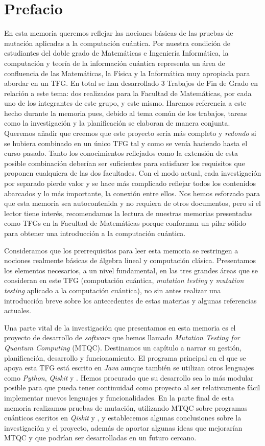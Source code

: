 
\chapter*{Prefacio}

En esta memoria queremos reflejar las nociones básicas de las pruebas de mutación aplicadas a la computación cuántica. Por nuestra condición de estudiantes del doble grado de Matemáticas e Ingeniería Informática, la computación y teoría de la información cuántica representa un área de confluencia de las Matemáticas, la Física y la Informática muy apropiada para abordar en un TFG.
%
En total se han desarrollado 3 Trabajos de Fin de Grado en relación a este tema: dos realizados para la Facultad de Matemáticas, por cada uno de los integrantes de este grupo, y este mismo. Haremos referencia a este hecho durante la memoria pues, debido al tema común de los trabajos, tareas como la investigación y la planificación se elaboran de manera conjunta.
%
Queremos añadir que creemos que este proyecto sería más completo y {\it redondo} si se hubiera combinado en un único TFG tal y como se venía haciendo hasta el curso pasado. Tanto los conocimientos reflejados como la extensión de esta posible combinación deberían ser suficientes para satisfacer los requisitos que proponen cualquiera de las dos facultades. Con el modo actual, cada investigación por separado pierde valor y se hace más complicado reflejar todos los contenidos abarcados y lo más importante, la conexión entre ellos.
%
Nos hemos esforzado para que esta memoria sea autocontenida y no requiera de otros documentos, pero si el lector tiene interés, recomendamos la lectura de nuestras memorias presentadas como TFGs en la Facultad de  Matemáticas porque conforman un pilar sólido para obtener una  introducción a la computación cuántica.

Consideramos que los prerrequisitos para leer esta memoria se restringen a nociones realmente básicas de álgebra lineal y computación clásica. Presentamos los elementos necesarios, a un nivel fundamental, en las tres grandes áreas que se consideran en este TFG (computación cuántica, \textit{mutation testing} y \textit{mutation testing} aplicado a la computación cuántica), no sin antes realizar una introducción breve sobre los antecedentes de estas materias y algunas referencias actuales.

Una parte vital de la investigación que presentamos en esta memoria es el proyecto de desarrollo de \textit{software} que hemos llamado \textit{Mutation Testing for Quantum Computing} (MTQC). Destinamos un capítulo a narrar su gestión, planificación, desarrollo y funcionamiento. El programa principal en el que se apoya esta TFG está escrito en \textit{Java} aunque también se utilizan otros lenguajes como \textit{Python}, \textit{Qiskit} y \qsh. Hemos procurado que su desarrollo sea lo más modular posible para que pueda tener continuidad como proyecto al ser relativamente fácil implementar nuevos lenguajes y funcionalidades.
%
En la parte final de esta memoria realizamos pruebas de mutación, utilizando MTQC sobre programas cuánticos escritos en \textit{Qiskit} y \qsh, y establecemos algunas conclusiones sobre la investigación y el proyecto, además de aportar algunas ideas que mejorarían MTQC y que podrían ser desarrolladas en un futuro cercano.

